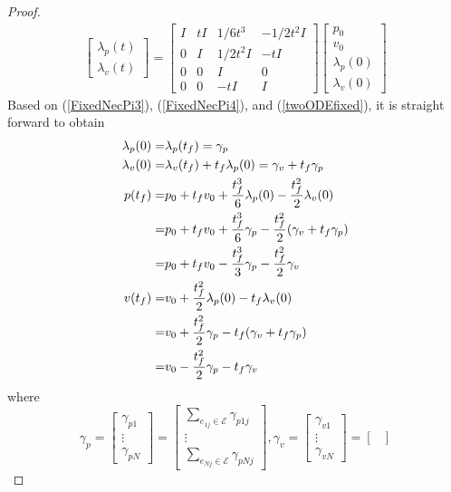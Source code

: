 \documentclass[12pt,draftcls,onecolumn]{IEEEtran}  %
\begin{document}
{\begin{proof}
\begin{align}
\begin{bmatrix}
\lambda_{p}(t)\\
\lambda_v(t)
\end{bmatrix}=\begin{bmatrix}
I&t I&1/6t^3&-1/2t^2I\\
0&I&1/2t^2I&-t I\\
0&0&I&0\\
0&0&-t I&I
\end{bmatrix}\begin{bmatrix}
p_0\\
v_0\\
\lambda_{p}(0)\\
\lambda_{v}(0)
\end{bmatrix}\label{twoODEfixed}
\end{align}
Based on (\ref{FixedNecPi3}), (\ref{FixedNecPi4}), and (\ref{twoODEfixed}), it is straight forward to obtain
\begin{align}
\lambda_p(0)=&\lambda_p(t_f) =\gamma_{p}\\
\lambda_v(0)=&\lambda_v(t_f)+t_f\lambda_p(0) =\gamma_{v}+t_f\gamma_p\\
p(t_f)=&p_0+t_fv_0+\frac{t_f^3}{6}\lambda_p(0) -\frac{t_f^2}{2}\lambda_v(0) \notag\\ =&p_0+t_fv_0+\frac{t_f^3}{6}\gamma_{p} -\frac{t_f^2}{2}(\gamma_v+t_f\gamma_{p})\notag\\
=&p_0+t_fv_0-\frac{t_f^3}{3}\gamma_{p} -\frac{t_f^2}{2}\gamma_v\label{ptffixed}\\
v(t_f)=&v_0+\frac{t_f^2}{2}\lambda_p(0)-t_f\lambda_v(0) \notag\\
=&v_0+\frac{t_f^2}{2}\gamma_{p} -t_f(\gamma_v+t_f\gamma_{p})\notag\\
=&v_0-\frac{t_f^2}{2}\gamma_{p} -t_f\gamma_v\label{vtffixed}
\end{align}
where
\[\gamma_p=\begin{bmatrix}
\gamma_{p1}\\
\vdots\\
\gamma_{pN}
\end{bmatrix}=\begin{bmatrix}
\sum_{e_{1j}\in{\mathcal{E}}}\gamma_{p1j}\\
\vdots\\
\sum_{e_{Nj}\in{\mathcal{E}}}\gamma_{pNj}
\end{bmatrix},
\gamma_v=\begin{bmatrix}
\gamma_{v1}\\
\vdots\\
\gamma_{vN}
\end{bmatrix}=\begin{bmatrix}

\end{bmatrix}\]
\end{proof}}
\end{document}
